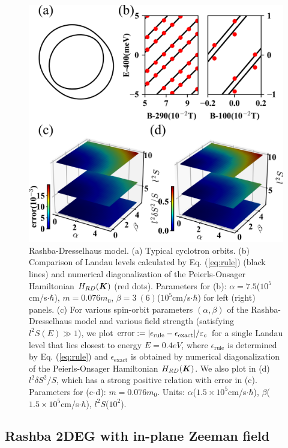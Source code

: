 \documentclass[aps, prb, showpacs, twocolumn, notitlepage, superscriptaddress]{revtex4-1}
\begin{document}
\begin{figure}
\includegraphics[width=1.0\columnwidth]{RD.png}
\caption{Rashba-Dresselhaus model. (a) Typical cyclotron orbits. (b) Comparison of Landau levels calculated by Eq. (\ref{eq:rule}) (black lines) and numerical diagonalization of the Peierls-Onsager Hamiltonian  $H_{RD}(\boldsymbol{K})$ (red dots). Parameters for (b): $\alpha=7.5$($10^{5}$cm/s$\cdot\hbar$), $m=0.076m_0$, $\beta=3~(6)$($10^{5}$cm/s$\cdot\hbar$) for left (right) panels. (c) For various spin-orbit parameters $(\alpha,\beta)$ of the Rashba-Dresselhaus model and various field strength (satisfying $l^2S(E)\gg 1$), we plot  $\text{error}:=|\epsilon_\text{rule}-\epsilon_\text{exact}|/\varepsilon_c$ for a single Landau level that lies closest to energy $E=0.4eV$, where $\epsilon_\text{rule}$ is determined by Eq. (\ref{eq:rule}) and $\epsilon_{\text{exact}}$ is obtained by numerical diagonalization of the Peierls-Onsager Hamiltonian  $H_{RD}(\boldsymbol{K})$. We also plot in (d) $l^2\delta S^2/S$, which has a strong positive relation with error in (c). Parameters for (c-d): $m=0.076m_0$. Units: $\alpha$($1.5\times 10^{5}$cm/s$\cdot\hbar$), $\beta$($1.5\times 10^{5}$cm/s$\cdot\hbar$), $l^2 S$($10^2$).\label{fig:RD}}
\end{figure}

\subsection{Rashba 2DEG with in-plane Zeeman field}\label{sec:inplanezeeman}
\end{document}
